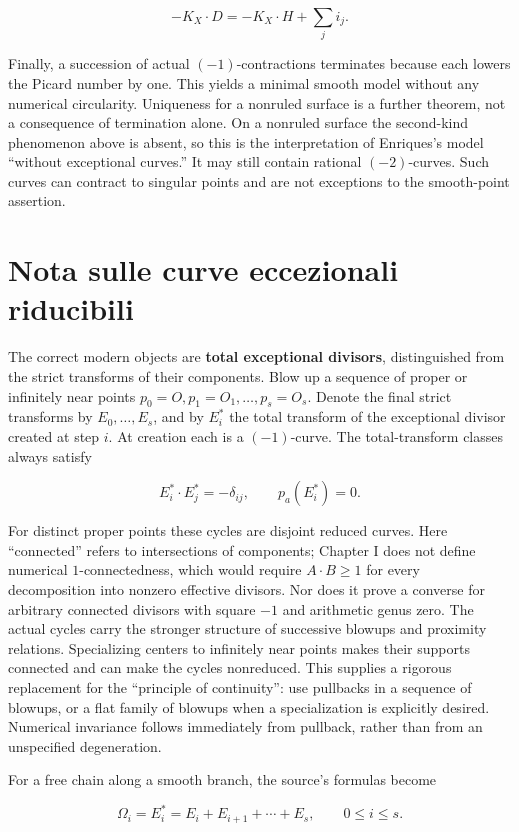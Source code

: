 \[
-K_X\cdot D=-K_X\cdot H+\sum_j i_j.
\]

Finally, a succession of actual \((-1)\)-contractions terminates because each lowers the Picard number by one. This yields a minimal smooth model without any numerical circularity. Uniqueness for a nonruled surface is a further theorem, not a consequence of termination alone. On a nonruled surface the second-kind phenomenon above is absent, so this is the interpretation of Enriques's model ``without exceptional curves.'' It may still contain rational \((-2)\)-curves. Such curves can contract to singular points and are not exceptions to the smooth-point assertion.

\section{Nota sulle curve eccezionali riducibili}
\label{enriques-I-12}

The correct modern objects are \textbf{total exceptional divisors}, distinguished from the strict transforms of their components. Blow up a sequence of proper or infinitely near points \(p_0=O,p_1=O_1,\ldots,p_s=O_s\). Denote the final strict transforms by \(E_0,\ldots,E_s\), and by \(E_i^*\) the total transform of the exceptional divisor created at step \(i\). At creation each is a \((-1)\)-curve. The total-transform classes always satisfy

\[
E_i^*\cdot E_j^*=-\delta_{ij},\qquad
p_a(E_i^*)=0.
\]

For distinct proper points these cycles are disjoint reduced curves. Here ``connected'' refers to intersections of components; Chapter I does not define numerical \(1\)-connectedness, which would require \(A\cdot B\ge1\) for every decomposition into nonzero effective divisors. Nor does it prove a converse for arbitrary connected divisors with square \(-1\) and arithmetic genus zero. The actual cycles carry the stronger structure of successive blowups and proximity relations. Specializing centers to infinitely near points makes their supports connected and can make the cycles nonreduced. This supplies a rigorous replacement for the ``principle of continuity'': use pullbacks in a sequence of blowups, or a flat family of blowups when a specialization is explicitly desired. Numerical invariance follows immediately from pullback, rather than from an unspecified degeneration.

For a free chain along a smooth branch, the source's formulas become

\[
\Omega_i=E_i^*=E_i+E_{i+1}+\cdots+E_s,\qquad 0\le i\le s.
\]

